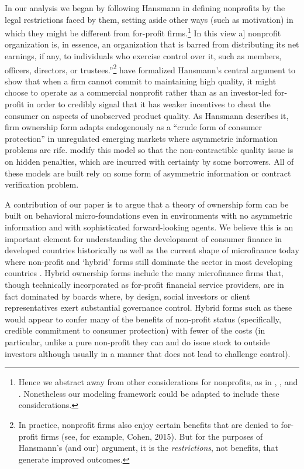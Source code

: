 \documentclass[11pt,english]{article}
\theoremstyle{plain}
\theoremstyle{definition}
\begin{document}
In our analysis we began by following Hansmann in defining nonprofits
by the legal restrictions faced by them, setting aside other ways
(such as motivation) in which they might be different from for-profit
firms.\footnote{Hence we abstract away from other considerations for nonprofits, as
in \citet{besley2005}, \citet{mcintosh2005}, and \citet{guha2013}.
Nonetheless our modeling framework could be adapted to include these
considerations.} In this view \textquotedbl{}{[}a{]} nonprofit organization is, in
essence, an organization that is barred from distributing its net
earnings, if any, to individuals who exercise control over it, such
as members, officers, directors, or trustees.\textquotedblright \footnote{In practice, nonprofit firms also enjoy certain benefits that are
denied to for-profit firms (see, for example, Cohen, 2015). But for
the purposes of Hansmann's (and our) argument, it is the \textit{restrictions},
not benefits, that generate improved outcomes.} \citet{glaeser2001} have formalized Hansmann's central argument
to show that when a firm cannot commit to maintaining high quality,
it might choose to operate as a commercial nonprofit rather than as
an investor-led for-profit in order to credibly signal that it has
weaker incentives to cheat the consumer on aspects of unobserved product
quality. As Hansmann describes it, firm ownership form adapts endogenously
as a ``crude form of consumer protection'' in unregulated emerging
markets where asymmetric information problems are rife. \citet{bubb_consumer_2013}
modify this model so that the non-contractible quality issue is on
hidden penalties, which are incurred with certainty by some borrowers.
All of these models are built rely on some form of asymmetric information
or contract verification problem.

A contribution of our paper is to argue that a theory of ownership
form can be built on behavioral micro-foundations even in environments
with no asymmetric information and with sophisticated forward-looking
agents. We believe this is an important element for understanding
the development of consumer finance in developed countries historically
as well as the current shape of microfinance today where non-profit
and `hybrid' forms still dominate the sector in most developing countries
\citep{cull2009,conning2011}. Hybrid ownership forms include the
many microfinance firms that, though technically incorporated as for-profit
financial service providers, are in fact dominated by boards where,
by design, social investors or client representatives exert substantial
governance control. Hybrid forms such as these would appear to confer
many of the benefits of non-profit status (specifically, credible
commitment to consumer protection) with fewer of the costs (in particular,
unlike a pure non-profit they can and do issue stock to outside investors
although usually in a manner that does not lead to challenge control).
\end{document}
